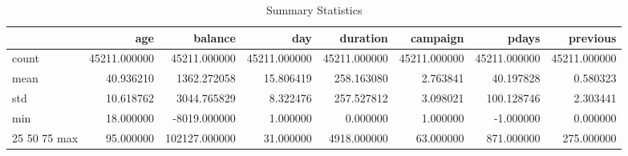 \begin{table}
\caption{Summary Statistics}
\label{tab:summary_stats}
\begin{tabular}{lrrrrrrr}
\toprule
 & age & balance & day & duration & campaign & pdays & previous \\
\midrule
count & 45211.000000 & 45211.000000 & 45211.000000 & 45211.000000 & 45211.000000 & 45211.000000 & 45211.000000 \\
mean & 40.936210 & 1362.272058 & 15.806419 & 258.163080 & 2.763841 & 40.197828 & 0.580323 \\
std & 10.618762 & 3044.765829 & 8.322476 & 257.527812 & 3.098021 & 100.128746 & 2.303441 \\
min & 18.000000 & -8019.000000 & 1.000000 & 0.000000 & 1.000000 & -1.000000 & 0.000000 \\
25%
50%
75%
max & 95.000000 & 102127.000000 & 31.000000 & 4918.000000 & 63.000000 & 871.000000 & 275.000000 \\
\bottomrule
\end{tabular}
\end{table}
